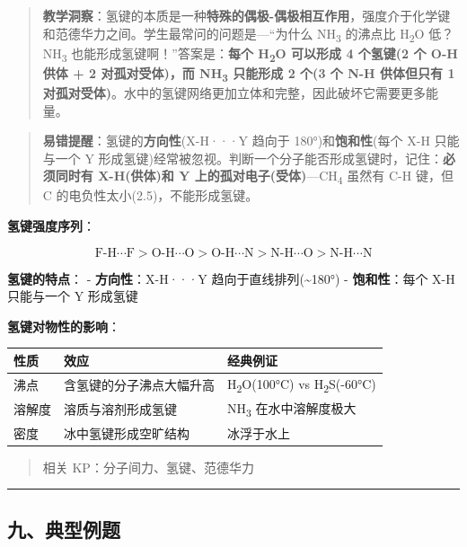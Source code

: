 \documentclass[a4paper,11pt]{ctexart}
\newcounter{none}
\newcommand{\箭}{\ensuremath{\rightarrow}}
\newcommand{\左箭}{\ensuremath{\leftarrow}}
\newcommand{\上箭}{\ensuremath{\uparrow}}
\newcommand{\下箭}{\ensuremath{\downarrow}}
\newcommand{\衡}{\ensuremath{\rightleftharpoons}}
\newcommand{\双箭}{\ensuremath{\leftrightarrow}}
\newcommand{\约等于}{\ensuremath{\approx}}
\newcommand{\小于等于}{\ensuremath{\leq}}
\newcommand{\大于等于}{\ensuremath{\geq}}
\newcommand{\不等于}{\ensuremath{\neq}}
\newcommand{\西格马}{\ensuremath{\sigma}}
\newcommand{\派}{\ensuremath{\pi}}
\begin{document}
\begin{quote}
\textbf{教学洞察}：氢键的本质是一种\textbf{特殊的偶极-偶极相互作用}，强度介于化学键和范德华力之间。学生最常问的问题是---``为什么 NH\textsubscript{3} 的沸点比 H\textsubscript{2}O 低？NH\textsubscript{3} 也能形成氢键啊！''答案是：\textbf{每个 H\textsubscript{2}O 可以形成 4 个氢键(2 个 O-H 供体 + 2 对孤对受体)，而 NH\textsubscript{3} 只能形成 2 个(3 个 N-H 供体但只有 1 对孤对受体)}。水中的氢键网络更加立体和完整，因此破坏它需要更多能量。
\end{quote}

\begin{quote}
\textbf{易错提醒}：氢键的\textbf{方向性}(X-H···Y 趋向于 180°)和\textbf{饱和性}(每个 X-H 只能与一个 Y 形成氢键)经常被忽视。判断一个分子能否形成氢键时，记住：\textbf{必须同时有 X-H(供体)和 Y 上的孤对电子(受体)}---CH\textsubscript{4} 虽然有 C-H 键，但 C 的电负性太小(2.5)，不能形成氢键。
\end{quote}

\textbf{氢键强度序列}：

\[
\text{F-H} \cdots \text{F} > \text{O-H} \cdots \text{O} > \text{O-H} \cdots \text{N} > \text{N-H} \cdots \text{O} > \text{N-H} \cdots \text{N}
\]

\textbf{氢键的特点}：
- \textbf{方向性}：X-H···Y 趋向于直线排列(\textasciitilde180°)
- \textbf{饱和性}：每个 X-H 只能与一个 Y 形成氢键

\textbf{氢键对物性的影响}：

{\def\LTcaptype{none} %
\begin{longtable}[]{@{}lll@{}}
\toprule\noalign{}
性质 & 效应 & 经典例证 \\
\midrule\noalign{}
\endhead
\bottomrule\noalign{}
\endlastfoot
沸点 & 含氢键的分子沸点大幅升高 & H\textsubscript{2}O(100°C) vs H\textsubscript{2}S(-60°C) \\
溶解度 & 溶质与溶剂形成氢键 & NH\textsubscript{3} 在水中溶解度极大 \\
密度 & 冰中氢键形成空旷结构 & 冰浮于水上 \\
\end{longtable}
}

\begin{quote}
相关 KP：分子间力、氢键、范德华力
\end{quote}

\begin{center}\rule{0.5\linewidth}{0.5pt}\end{center}

\subsection{九、典型例题}\label{ux4e5dux5178ux578bux4f8bux9898}
\end{document}
